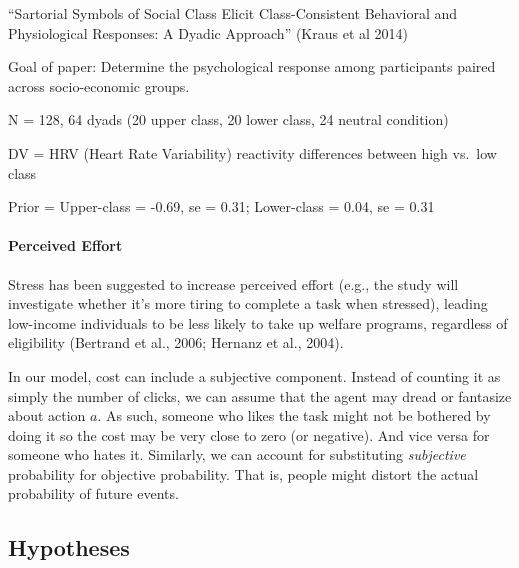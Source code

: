 \documentclass[
]{article}
\let\oldparagraph\paragraph
\renewcommand{\paragraph}[1]{\oldparagraph{#1}\mbox{}}
\begin{document}
``Sartorial Symbols of Social Class Elicit Class-Consistent Behavioral
and Physiological Responses: A Dyadic Approach'' (Kraus et al 2014)

Goal of paper: Determine the psychological response among participants
paired across socio-economic groups.

N = 128, 64 dyads (20 upper class, 20 lower class, 24 neutral condition)

DV = HRV (Heart Rate Variability) reactivity differences between high
vs.~low class

Prior = Upper-class = -0.69, se = 0.31; Lower-class = 0.04, se = 0.31

\hypertarget{perceived-effort}{%
\paragraph{Perceived Effort}\label{perceived-effort}}

Stress has been suggested to increase perceived effort (e.g., the study
will investigate whether it's more tiring to complete a task when
stressed), leading low-income individuals to be less likely to take up
welfare programs, regardless of eligibility (Bertrand et al., 2006;
Hernanz et al., 2004).

In our model, cost can include a subjective component. Instead of
counting it as simply the number of clicks, we can assume that the agent
may dread or fantasize about action \(a\). As such, someone who likes
the task might not be bothered by doing it so the cost may be very close
to zero (or negative). And vice versa for someone who hates it.
Similarly, we can account for substituting \emph{subjective} probability
for objective probability. That is, people might distort the actual
probability of future events.

\hypertarget{hypotheses-1}{%
\subsection{Hypotheses}\label{hypotheses-1}}
\end{document}
